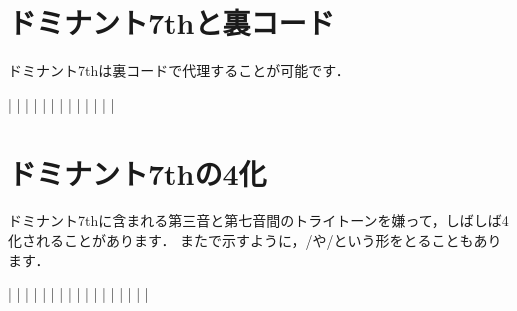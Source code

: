 \documentclass[dvipdfmx,uplatex,b5paper,openany,jbase=12Q,nomag*,textwidth-limit=44%
               ]{gachimuchi}
\begin{document}
\section{ドミナント7thと裏コード}
ドミナント7thは裏コードで代理することが可能です．

\begin{Music}
  \generalmeter{\meterC}%
  \Startpiece%
  \NOTes%
  |%
  \en%
  \NOTes%
  |%
  \en%
  \bar%
  \NOTes%
  |%
  \en%
  \NOTes%
  |%
  \en%
  \bar%
  \NOtes%
  |%
  \en%
  \NOtes%
  |%
  \en%
  \NOTes%
  |%
  \en%
  \bar%
  \NOTEs%
  |%
  \en%
  \bar%
  \NOTEs%
  |%
  \en%
  \setdoubleBAR\endpiece
\end{Music}
\section{ドミナント7thの\Sus4化}
ドミナント7thに含まれる第三音と第七音間のトライトーンを嫌って，しばしば\Sus4化されることがあります．
またで示すように，\Gniv/\Gnv や\Gnii\Min{}/\Gnv という形をとることもあります．

\begin{Music}
  \generalmeter{\meterC}%
  \Startpiece%
  \NOTEs%
  |%
  \en%
  \bar%
  \NOTEs%
  |%
  \en%
  \bar%
  \NOTEs%
  |%
  \en%
  \bar%
  \NOTEs%
  |%
  \en%
  \bar%
  \NOTEs%
  |%
  \en%
  \doubleBAR
  \NOTes\Mryaku\sk|\Mryaku\sk\en
  \NOTes%
  |\en%
  \bar%
  \NOTEs%
  |%
  \en%
  \doubleBAR
  \NOTes\Mryaku\sk|\Mryaku\sk\en
  \NOTes%
  |\en%
  \bar%
  \NOTEs%
  |%
  \en%
  \setdoubleBAR\endpiece
\end{Music}
\end{document}
